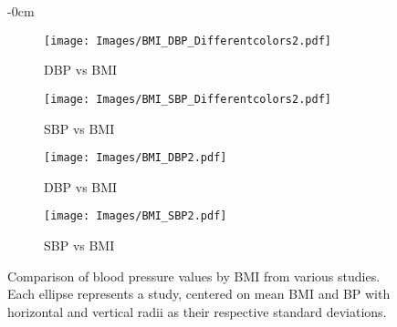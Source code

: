 \documentclass[journal,article,moreauthors]{Definitions/mdpi}
\begin{document}
\begin{figure}[tb]
\begin{adjustwidth}{-\extralength}{0cm}
\centering
  \hfill
\begin{subfigure}{0.25\columnwidth}
\texttt{[image: Images/BMI\_DBP\_Differentcolors2.pdf]}
  \caption{DBP vs BMI}
  \label{Fig: DBP_vs_BMI}
\end{subfigure}%
  \hfill
\begin{subfigure}{0.25\columnwidth}
  \texttt{[image: Images/BMI\_SBP\_Differentcolors2.pdf]}
  \caption{SBP vs BMI}
  \label{Fig: SBP_vs_BMI}
\end{subfigure}
  \hfill
\begin{subfigure}{0.25\columnwidth}
  \texttt{[image: Images/BMI\_DBP2.pdf]}
  \caption{DBP vs BMI}
  \label{Fig: HEATMAP_DBP_BMI}
\end{subfigure}%
  \hfill
\begin{subfigure}{0.25\columnwidth}
  \texttt{[image: Images/BMI\_SBP2.pdf]}\caption{SBP vs BMI}
  \label{Fig: HEATMAP_SBP_BMI}
\end{subfigure}
  \hfill
\caption{Comparison of blood pressure values by BMI from various studies. Each ellipse represents a study, centered on mean BMI and BP with horizontal and vertical radii as their respective standard deviations.}
\label{Fig: BMIandBP}
\end{adjustwidth}
\end{figure}


\end{document}
